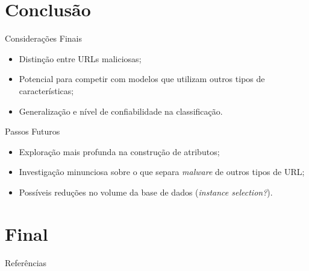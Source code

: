 \documentclass{beamer}
\begin{document}
\section{Conclusão}

\begin{frame}{Considerações Finais}

    \begin{itemize}
        \setlength{\itemsep}{10pt}
        \item Distinção entre URLs maliciosas;
        \item Potencial para competir com modelos que utilizam outros tipos de características;
        \item Generalização e nível de confiabilidade na classificação.
    \end{itemize}
    
\end{frame}

\begin{frame}{Passos Futuros}

    \begin{itemize}
        \setlength{\itemsep}{10pt}
        \item Exploração mais profunda na construção de atributos;
        \item Investigação minunciosa sobre o que separa \emph{malware} de outros tipos de URL;
        \item Possíveis reduções no volume da base de dados (\emph{instance selection?}).
    \end{itemize}
    
\end{frame}

\section*{Final}

\begin{frame}{Referências}
    \scriptsize
    
\end{frame}
\end{document}
